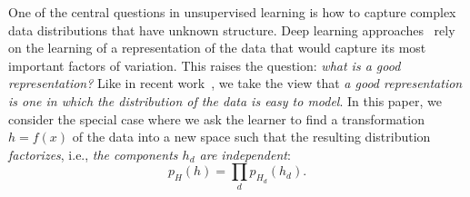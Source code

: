 \documentclass{article}
\begin{document}
One of the central questions in unsupervised learning is how to capture
complex data distributions that have unknown structure. Deep learning
approaches~\citep{Bengio-2009-book} rely on the learning of a representation
of the data that would capture its most important factors
of variation. This raises the question: {\em what is a good representation?}
Like in recent work~\citep{Kingma+Welling-ICLR2014,Rezende-et-al-arxiv2014,Ozair+Bengio-arxiv2014},
we take the view that {\em a good representation is one in which the distribution
of the data is easy to model}.  In this paper,  we consider the
special case where we ask the learner to find a transformation $h=f(x)$ of the data
into a new space such that the resulting distribution {\em factorizes}, i.e., 
{\em the components $h_d$ are independent}:
\[
  p_H(h) = \prod_d p_{H_d}(h_d).
\]
\end{document}
